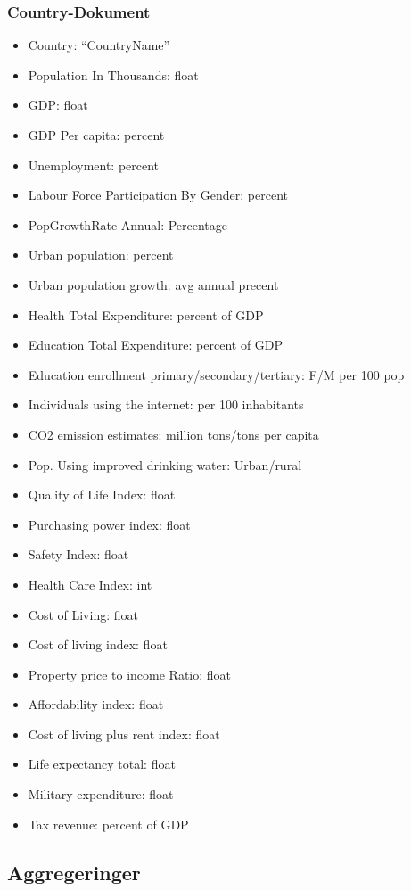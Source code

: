\subsubsection{Country-Dokument}
\begin{itemize}
  \item Country: “CountryName”
  \item Population In Thousands: float
  \item GDP: float
  \item GDP Per capita: percent
  \item Unemployment: percent
  \item Labour Force Participation By Gender: percent
  \item PopGrowthRate Annual: Percentage
  \item Urban population: percent
  \item Urban population growth: avg annual precent%
  \item Health Total Expenditure: percent of GDP
  \item Education Total Expenditure: percent of GDP
  \item Education enrollment primary/secondary/tertiary: F/M per 100 pop
  \item Individuals using the internet: per 100 inhabitants
  \item CO2 emission estimates: million tons/tons per capita
  \item Pop. Using improved drinking water: Urban/rural %
  \item Quality of Life Index: float
  \item Purchasing power index: float
  \item Safety Index: float
  \item Health Care Index: int
  \item Cost of Living: float
  \item Cost of living index: float
  \item Property price to income Ratio: float
  \item Affordability index: float
  \item Cost of living plus rent index: float
  \item Life expectancy total: float
  \item Military expenditure: float
  \item Tax revenue: percent of GDP
\end{itemize}

\subsection{Aggregeringer}
